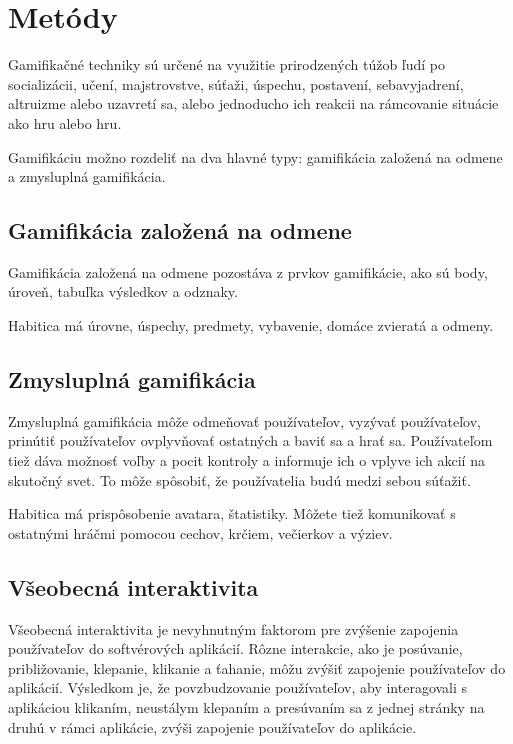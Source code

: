 \documentclass[10pt,twoside,slovak,a4paper]{article}
\begin{document}
\section{Metódy} \label{methods}

Gamifikačné techniky sú určené na využitie prirodzených túžob ľudí po socializácii, učení, majstrovstve, súťaži, úspechu, postavení, sebavyjadrení, altruizme alebo uzavretí sa, alebo jednoducho ich reakcii na rámcovanie situácie ako hru alebo hru.\cite{Shallow}

Gamifikáciu možno rozdeliť na dva hlavné typy: gamifikácia založená na odmene a zmysluplná gamifikácia. \cite{Methods}

\subsection{Gamifikácia založená na odmene} \label{methods:reward}
Gamifikácia založená na odmene pozostáva z prvkov gamifikácie, ako sú body, úroveň, tabuľka výsledkov a odznaky.

\cite{Methods} Habitica má úrovne, úspechy, predmety, vybavenie, domáce zvieratá a odmeny.

\subsection{Zmysluplná gamifikácia} \label{methods:meaningful}
Zmysluplná gamifikácia môže odmeňovať používateľov, vyzývať používateľov, prinútiť používateľov ovplyvňovať ostatných a baviť sa a hrať sa. Používateľom tiež dáva možnosť voľby a pocit kontroly a informuje ich o vplyve ich akcií na skutočný svet. To môže spôsobiť, že používatelia budú medzi sebou súťažiť.\cite{Methods}

Habitica má prispôsobenie avatara, štatistiky. Môžete tiež komunikovať s ostatnými hráčmi pomocou cechov, krčiem, večierkov a výziev.

\subsection{Všeobecná interaktivita} \label{methods:interactivity}
Všeobecná interaktivita je nevyhnutným faktorom pre zvýšenie zapojenia používateľov do softvérových aplikácií. Rôzne interakcie, ako je posúvanie, približovanie, klepanie, klikanie a ťahanie, môžu zvýšiť zapojenie používateľov do aplikácií. Výsledkom je, že povzbudzovanie používateľov, aby interagovali s aplikáciou klikaním, neustálym klepaním a presúvaním sa z jednej stránky na druhú v rámci aplikácie, zvýši zapojenie používateľov do aplikácie.\cite{Methods}
\end{document}
